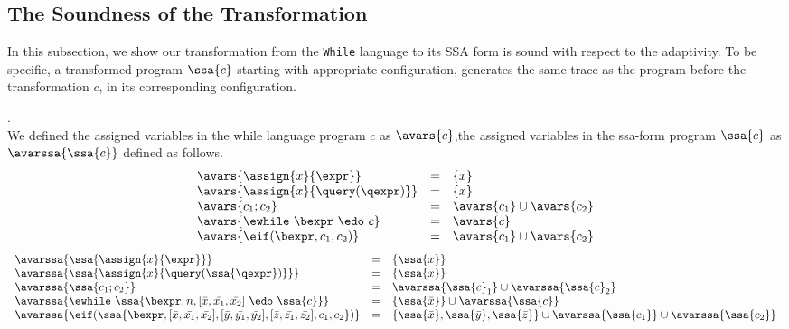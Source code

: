 \subsection{The Soundness of the Transformation}
In this subsection, we show our transformation from the {\tt While} language to its SSA form is sound with respect to the adaptivity. 
To be specific, a transformed program $\ssa{c}$ starting with appropriate configuration, generates the same trace as the program before the transformation $c$, in its corresponding configuration.
%
%
\begin{defn}.
\\
We defined the assigned variables in the while language program $c$ as $\avars{c}$,the assigned variables in the ssa-form program $\ssa{c}$ as $\avarssa{\ssa{c}}$ defined as follows.
\[
\begin{array}{lll}
    \avars{\assign{x}{\expr}} & =& \{ x \} \\
    \avars{\assign{x}{\query(\qexpr)}} & =& \{ x \} \\
    \avars{c_1; c_2}  & = & \avars{c_1} \cup \avars{c_2} \\
    \avars{\ewhile ~ \bexpr ~ \edo ~ c} &= &  \avars{c} \\
    \avars{\eif(\bexpr, c_1, c_2)} & =&  \avars{c_1} \cup \avars{c_2}\\
\end{array} 
\]
%
\[
\begin{array}{lll}
    \avarssa{\ssa{\assign{x}{\expr}}} & =& \{ \ssa{x} \}
    \\
    \avarssa{\ssa{\assign{x}{\query(\ssa{\qexpr})}}} & =& \{ \ssa{x} \}
    \\
    \avarssa{\ssa{c_1; c_2 } }  & = & \avarssa{\ssa{c}_1} \cup \avarssa{\ssa{c}_2}
    \\
    \avarssa{\ewhile ~ \ssa{\bexpr, n, [\bar{x}, \bar{x_1}, \bar{x_2}] ~ \edo ~ \ssa{c}}}
    & = &  
    \{\ssa{\bar{x}}\} \cup \avarssa{\ssa{c}} 
    \\
    \avarssa{\eif(\ssa{\bexpr,[\bar{x}, \bar{x_1}, \bar{x_2}],[\bar{y}, \bar{y_1}, \bar{y_2}],[\bar{z}, \bar{z_1}, \bar{z_2}], c_1, c_2} )} 
    & =&  \{ \ssa{\bar{x}},\ssa{\bar{y}} , \ssa{\bar{z}} \} 
    \cup \avarssa{\ssa{c_1}} \cup \avarssa{\ssa{c_2}}\\
\end{array}
\]
\end{defn}
